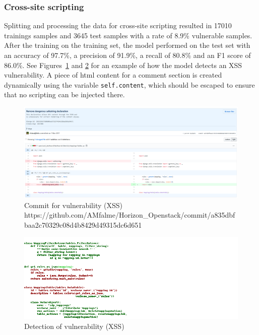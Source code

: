 \documentclass[
a4paper,
pagesize,
pdftex,
12pt,
twoside, %
BCOR=5mm, %
ngerman,
fleqn,
final,
]{scrartcl}
\begin{document}
	\newpage
	
	\subsubsection{Cross-site scripting}
	Splitting and processing the data for cross-site scripting resulted in 17010 trainings samples and 3645 test samples with a rate of 8.9\% vulnerable samples. After the training on the training set, the model performed on the test set with an accuracy of 97.7\%, a precision of 91.9\%, a recall of 80.8\% and an F1 score of 86.0\%. See Figures~\ref{fig:xssA} and \ref{fig:xssAr} for an example of how the model detects an XSS vulnerability. A piece of html content for a comment section is created dynamically using the variable \texttt{self.content}, which should be escaped to ensure that no scripting can be injected there.
	
	\begin{figure}[H]
		\centering
		\includegraphics[width=\linewidth]{Images/xssA}
		\caption{Commit for vulnerability (XSS) \newline \scriptsize{https://github.com/AMfalme/Horizon\_Openstack/commit/a835dbfbaa2c70329c08d4b8429d49315dc6d651}}
		\label{fig:xssA}
	\end{figure}
	\begin{figure}[H]
		\centering
		\includegraphics[width=\linewidth]{Images/xssAr}
		\caption{Detection of vulnerability (XSS)}
		\label{fig:xssAr}
	\end{figure}
	
\end{document}
